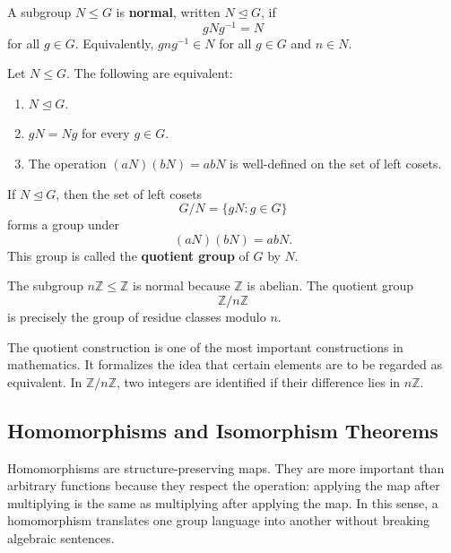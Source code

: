 \begin{definition}
A subgroup $N\leq G$ is \textbf{normal}, written $N\trianglelefteq G$, if
\[
    gNg^{-1}=N
\]
for all $g\in G$. Equivalently, $gng^{-1}\in N$ for all $g\in G$ and $n\in N$.
\end{definition}

\begin{proposition}
Let $N\leq G$. The following are equivalent:
\begin{enumerate}
    \item $N\trianglelefteq G$.
    \item $gN=Ng$ for every $g\in G$.
    \item The operation $(aN)(bN)=abN$ is well-defined on the set of left cosets.
\end{enumerate}
\end{proposition}



\begin{definition}
If $N\trianglelefteq G$, then the set of left cosets
\[
    G/N=\{gN:g\in G\}
\]
forms a group under
\[
    (aN)(bN)=abN.
\]
This group is called the \textbf{quotient group} of $G$ by $N$.
\end{definition}

\begin{example}
The subgroup $n\mathbb{Z}\leq\mathbb{Z}$ is normal because $\mathbb{Z}$ is abelian. The quotient group
\[
    \mathbb{Z}/n\mathbb{Z}
\]
is precisely the group of residue classes modulo $n$.
\end{example}


\begin{remark}
The quotient construction is one of the most important constructions in mathematics. It formalizes the idea that certain elements are to be regarded as equivalent. In $\mathbb{Z}/n\mathbb{Z}$, two integers are identified if their difference lies in $n\mathbb{Z}$.
\end{remark}

\subsection{Homomorphisms and Isomorphism Theorems}


Homomorphisms are structure-preserving maps. They are more important than arbitrary functions because they respect the operation: applying the map after multiplying is the same as multiplying after applying the map. In this sense, a homomorphism translates one group language into another without breaking algebraic sentences.

